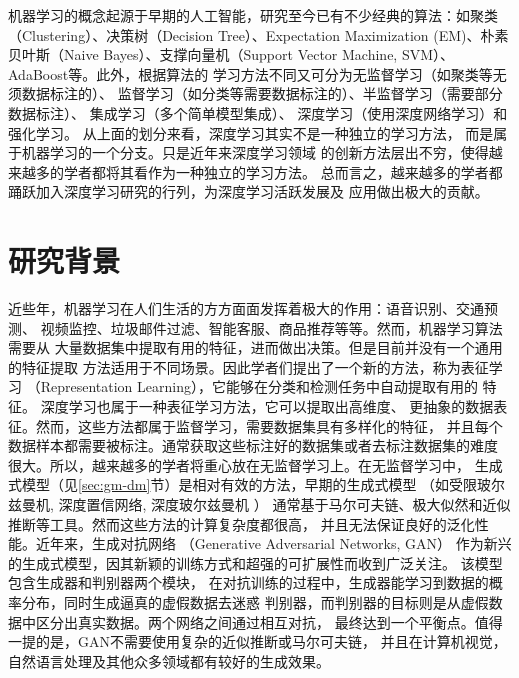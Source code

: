 机器学习的概念起源于早期的人工智能，研究至今已有不少经典的算法：如聚类（Clustering）、决策树（Decision Tree）、Expectation Maximization (EM)、朴素贝叶斯（Naive Bayes）、支撑向量机（Support Vector Machine, SVM）、AdaBoost等。此外，根据算法的
学习方法不同又可分为无监督学习（如聚类等无须数据标注的）、
监督学习（如分类等需要数据标注的）、半监督学习（需要部分数据标注）、
集成学习（多个简单模型集成）、
深度学习（使用深度网络学习）和强化学习。
从上面的划分来看，深度学习其实不是一种独立的学习方法，
而是属于机器学习的一个分支。只是近年来深度学习领域
的创新方法层出不穷，使得越来越多的学者都将其看作为一种独立的学习方法。
总而言之，越来越多的学者都踊跃加入深度学习研究的行列，为深度学习活跃发展及
应用做出极大的贡献。

\section{研究背景}
近些年，机器学习在人们生活的方方面面发挥着极大的作用：语音识别、交通预测、
视频监控、垃圾邮件过滤、智能客服、商品推荐等等。然而，机器学习算法需要从
大量数据集中提取有用的特征，进而做出决策。但是目前并没有一个通用的特征提取
方法适用于不同场景。因此学者们提出了一个新的方法，称为表征学习
（Representation Learning），它能够在分类和检测任务中自动提取有用的
特征\cite{bengio2013representation}。
深度学习\cite{lecun2015deep}也属于一种表征学习方法，它可以提取出高维度、
更抽象的数据表征。然而，这些方法都属于监督学习，需要数据集具有多样化的特征，
并且每个数据样本都需要被标注。通常获取这些标注好的数据集或者去标注数据集的难度
很大。所以，越来越多的学者将重心放在无监督学习上。在无监督学习中，
生成式模型（见\ref{sec:gm-dm}节）是相对有效的方法，早期的生成式模型
（如受限玻尔兹曼机\cite{smolensky1986information},
深度置信网络\cite{hinton2006fast}, 深度玻尔兹曼机\cite{salakhutdinov2009deep}
）
通常基于马尔可夫链、极大似然和近似推断等工具。然而这些方法的计算复杂度都很高，
并且无法保证良好的泛化性能。近年来，生成对抗网络
（Generative Adversarial Networks, GAN）\cite{goodfellow2014generative}
作为新兴的生成式模型，因其新颖的训练方式和超强的可扩展性而收到广泛关注。
该模型包含生成器和判别器两个模块，
在对抗训练的过程中，生成器能学习到数据的概率分布，同时生成逼真的虚假数据去迷惑
判别器，而判别器的目标则是从虚假数据中区分出真实数据。两个网络之间通过相互对抗，
最终达到一个平衡点。值得一提的是，GAN不需要使用复杂的近似推断或马尔可夫链，
并且在计算机视觉，自然语言处理及其他众多领域都有较好的生成效果。


